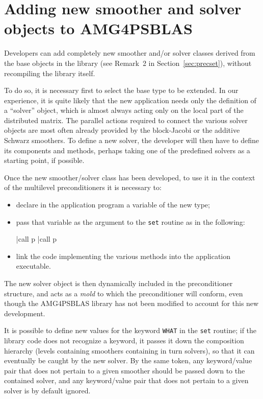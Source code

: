 
\clearpage

\section{Adding new smoother and solver objects to AMG4PSBLAS\label{sec:adding}}

Developers can add completely new smoother and/or solver classes
derived from the base objects in the library (see Remark~2 in Section~\ref{sec:precset}),
without recompiling the library itself.

To do so, it is necessary first to select the base type to be extended.
In our experience, it is quite likely that the new application needs
only the definition of a ``solver'' object, which is almost
always acting only on the local part of the distributed matrix.
The parallel actions required to connect the various solver objects
are most often already provided by the block-Jacobi or the additive
Schwarz smoothers.  To define a new solver, the developer will then
have to define its components and methods, perhaps taking one of the
predefined solvers as a starting point, if possible.

Once the new smoother/solver class has been developed, to use it in
the context of the multilevel preconditioners it is necessary to:
\begin{itemize}
\item declare in the application program a variable of the new type;
\item  pass that variable as the argument to the \verb|set| routine as in the
following:
\begin{center}
\fortinline|call p%
\fortinline|call p%
\end{center}
\item link the code implementing the various methods into the application executable.
\end{itemize}
The new solver object is then dynamically included in the
preconditioner structure, and acts as a \emph{mold} to which the
preconditioner will conform, even though the AMG4PSBLAS library has not
been modified to account for this new development.

It is possible to define new values for the keyword \verb|WHAT| in the
\verb|set| routine; if the library code does not recognize a keyword,
it passes it down the composition hierarchy (levels containing
smoothers containing in turn solvers), so that it can eventually be caught by
the new solver. By the same token, any keyword/value pair that does not pertain to
a given smoother should be passed down to the contained solver, and
any keyword/value pair that does not pertain to a given solver is by
default ignored.

